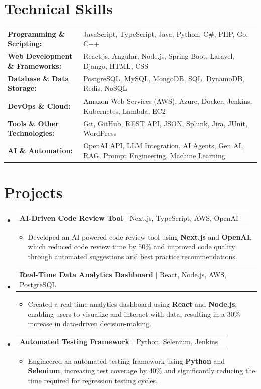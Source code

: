 \documentclass[letterpaper,10pt]{article}
\makeatletter
\newcommand{\resumeItem}[1]{
  \item{\fontsize{8pt}{9pt}\selectfont
    #1 \vspace{-3pt}
  }
}
\newcommand{\resumeProjectHeading}[2]{
    \item
    \begin{tabular*}{1.001\textwidth}{l@{\extracolsep{\fill}}r}
      \fontsize{8.5pt}{10pt}#1 & \textbf{\fontsize{8.5pt}{10pt} #2}\\
    \end{tabular*}\vspace{-7pt}
}
\newcommand{\resumeSubHeadingListStart}{\begin{itemize}[leftmargin=0pt, label={}]}
\newcommand{\resumeSubHeadingListEnd}{\end{itemize}}
\newcommand{\resumeItemListStart}{\begin{itemize}[leftmargin=*]}
\newcommand{\resumeItemListEnd}{\end{itemize}\vspace{-5pt}}
\makeatother
\begin{document}
\section{Technical Skills}
        \vspace{-14pt}
        \begin{table}[h]
            \fontsize{8pt}{9pt}\selectfont
            \begin{tabular}{p{0.3\linewidth} p{0.7\linewidth}}
                \textbf{Programming \& Scripting:} & JavaScript, TypeScript, Java, Python, C\#, PHP, Go, C++ \\
                \textbf{Web Development \& Frameworks:} & React.js, Angular, Node.js, Spring Boot, Laravel, Django, HTML, CSS \\
                \textbf{Database \& Data Storage:} & PostgreSQL, MySQL, MongoDB, SQL, DynamoDB, Redis, NoSQL \\
                \textbf{DevOps \& Cloud:} & Amazon Web Services (AWS), Azure, Docker, Jenkins, Kubernetes, Lambda, EC2 \\
                \textbf{Tools \& Other Technologies:} & Git, GitHub, REST API, JSON, Splunk, Jira, JUnit, WordPress \\
                \textbf{AI \& Automation:} & OpenAI API, LLM Integration, AI Agents, Gen AI, RAG, Prompt Engineering, Machine Learning \\
            \end{tabular}
        \end{table}
 \vspace{-18pt}

\section{Projects}
    \vspace{-5pt}
    \resumeSubHeadingListStart
          \resumeProjectHeading
            {\textbf{AI-Driven Code Review Tool} $|$ Next.js, TypeScript, AWS, OpenAI}{}
            \resumeItemListStart
                \resumeItem{Developed an AI-powered code review tool using \textbf{Next.js} and \textbf{OpenAI}, which reduced code review time by 50\% and improved code quality through automated suggestions and best practice recommendations.}
            \resumeItemListEnd
        \vspace{-12pt}
    
        \resumeProjectHeading
            {\textbf{Real-Time Data Analytics Dashboard} $|$ React, Node.js, AWS, PostgreSQL}{}
        \resumeItemListStart
                \resumeItem{Created a real-time analytics dashboard using \textbf{React} and \textbf{Node.js}, enabling users to visualize and interact with data, resulting in a 30\% increase in data-driven decision-making.}
        \resumeItemListEnd
      \vspace{-12pt}
      \resumeProjectHeading
        {\textbf{Automated Testing Framework} $|$ Python, Selenium, Jenkins}{}
    \resumeItemListStart
            \resumeItem{Engineered an automated testing framework using \textbf{Python} and \textbf{Selenium}, increasing test coverage by 40\% and significantly reducing the time required for regression testing cycles.}
    \resumeItemListEnd
    \resumeSubHeadingListEnd
\end{document}

